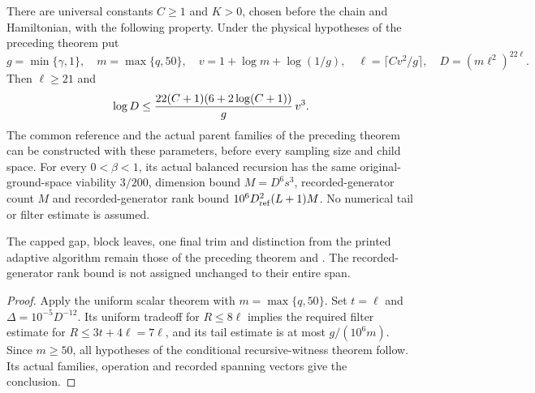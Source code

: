 \begin{theorem}
    \label{thm:physical_dg_interval_tree_parameters}
    \leanok
    There are universal constants $C\ge1$ and $K>0$, chosen before the
    chain and Hamiltonian, with the following property. Under the physical
    hypotheses of the preceding theorem put
    \[
        g=\min\{\gamma,1\},\quad m=\max\{q,50\},\quad
        v=1+\log m+\log(1/g),\quad
        \ell=\lceil Cv^2/g\rceil,\quad D=(m\ell^2)^{22\ell}.
    \]
    Then $\ell\ge21$ and
    \[
        \log D\le {22(C+1)(6+2\log(C+1))\over g}\,v^3.
    \]
    The common reference and the actual parent families of the preceding
    theorem can be constructed with these parameters, before every
    sampling size and child space. For every $0<\beta<1$, its actual
    balanced recursion has the same original-ground-space viability
    $3/200$, dimension bound $M=D^6s^3$, recorded-generator count $M$
    and recorded-generator rank bound $10^6D_{\rm ref}^2(L+1)M$.
    No numerical tail or filter estimate is assumed.

    The capped gap, block leaves, one final trim and distinction from the
    printed adaptive algorithm remain those of the preceding theorem and
    \cite{gap:alvv16_approximation_parameters}. The recorded-generator
    rank bound is not assigned unchanged to their entire span.
\end{theorem}
\begin{proof}\leanok
    Apply the uniform scalar theorem with $m=\max\{q,50\}$.
    Set $t=\ell$ and $\Delta=10^{-5}D^{-12}$. Its uniform tradeoff for
    $R\le8\ell$ implies the required filter estimate for
    $R\le3t+4\ell=7\ell$, and its tail estimate is at most
    $g/(10^6m)$. Since $m\ge50$, all hypotheses of the conditional
    recursive-witness theorem follow. Its actual families, operation and
    recorded spanning vectors give the conclusion.
\end{proof}


